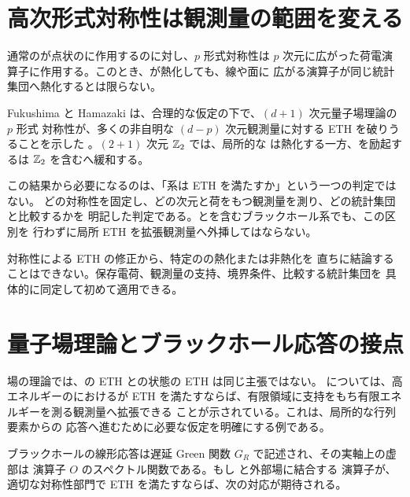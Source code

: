 \section{高次形式対称性は観測量の範囲を変える}

通常のが点状のに作用するのに対し、$p$ 形式対称性は
$p$ 次元に広がった荷電演算子に作用する。このとき、が熱化しても、線や面に
広がる演算子が同じ統計集団へ熱化するとは限らない。

Fukushima と Hamazaki は、合理的な仮定の下で、$(d+1)$ 次元量子場理論の $p$ 形式
対称性が、多くの非自明な $(d-p)$ 次元観測量に対する ETH を破りうることを示した
\cite{Fukushima:2023svf}。$(2+1)$ 次元 $\mathbb{Z}_2$ では、局所的な
は熱化する一方、を励起するは $\mathbb{Z}_2$ を含むへ緩和する。

この結果から必要になるのは、「系は ETH を満たすか」という一つの判定ではない。
どの対称性を固定し、どの次元と荷をもつ観測量を測り、どの統計集団と比較するかを
明記した判定である。とを含むブラックホール系でも、この区別を
行わずに局所 ETH を拡張観測量へ外挿してはならない。

\begin{warningbox}
対称性による ETH の修正から、特定のの熱化または非熱化を
直ちに結論することはできない。保存電荷、観測量の支持、境界条件、比較する統計集団を
具体的に同定して初めて適用できる。
\end{warningbox}

\section{量子場理論とブラックホール応答の接点}

場の理論では、の ETH との状態の ETH は同じ主張ではない。
については、高エネルギーのにおけるが
ETH を満たすならば、有限領域に支持をもち有限エネルギーを測る観測量へ拡張できる
ことが示されている\cite{Lashkari:2018CFTETH}。これは、局所的な行列要素からの
応答へ進むために必要な仮定を明確にする例である。

ブラックホールの線形応答は遅延 Green 関数 $G_R$ で記述され、その実軸上の虚部は
演算子 $O$ のスペクトル関数である。もし と外部場に結合する
演算子が、適切な対称性部門で ETH を満たすならば、次の対応が期待される。


